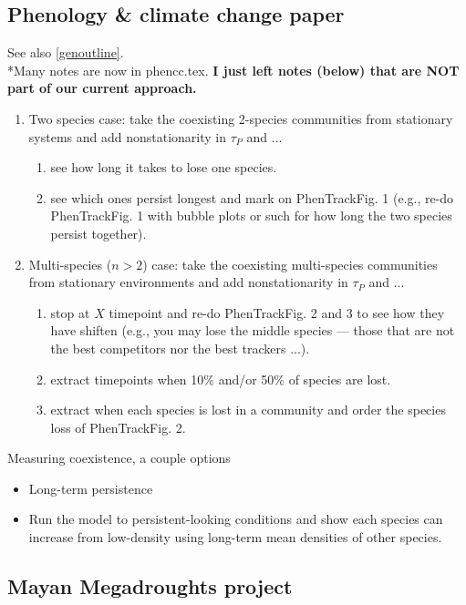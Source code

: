\documentclass[11pt,a4paper,oneside]{article}
\newenvironment{smitemize}{
\begin{itemize}
  \setlength{\itemsep}{1pt}
  \setlength{\parskip}{0pt}
  \setlength{\parsep}{0pt}}
{\end{itemize}
}
\begin{document}
\subsection{Phenology \& climate change paper}\label{phenCCpaper}
See also \ref{genoutline}.\\

*Many notes are now in phencc.tex. {\bf I just left notes (below) that are NOT part of our current approach.}

\begin{enumerate}
\item Two species case: take the coexisting 2-species communities from stationary systems and add nonstationarity in $\tau_P$ and ...
\begin{enumerate}
\item see how long it takes to lose one species. 
\item see which ones persist longest and mark on PhenTrackFig. 1 (e.g., re-do PhenTrackFig. 1 with bubble plots or such for how long the two species persist together).
\end{enumerate}
\item Multi-species ($n>2$) case: take the coexisting multi-species communities from stationary environments and add nonstationarity in $\tau_P$ and ...
\begin{enumerate}
\item stop at $X$ timepoint and re-do PhenTrackFig. 2 and 3 to see how they have shiften (e.g., you may lose the middle species --- those that are not the best competitors nor the best trackers ...).
\item extract timepoints when 10\% and/or 50\% of species are lost. 
\item extract when each species is lost in a community and order the species loss of PhenTrackFig. 2.
\end{enumerate}
\end{enumerate}

Measuring coexistence, a couple options
\begin{smitemize}
\item Long-term persistence
\item Run the model to persistent-looking conditions and show each species can increase from low-density using long-term mean densities of other species.
\end{smitemize}

\subsection{Mayan Megadroughts project}
\end{document}
